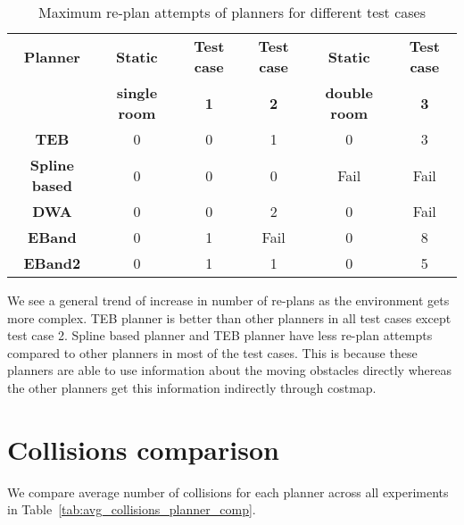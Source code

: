 \begin{table}[H]
    \centering
    \begin{tabular}{cccccc}\toprule
        \textbf{Planner} & \textbf{Static} & \textbf{Test case} & \textbf{Test case} & \textbf{Static} & \textbf{Test case} \\
                         & \textbf{single room} & \textbf{1} & \textbf{2} & \textbf{double room}       & \textbf{3} \\\toprule
        \textbf{TEB         } & 0 & 0 & 1 & 0 & 3 \\
        \textbf{Spline based} & 0 & 0 & 0 & Fail & Fail \\
        \textbf{DWA         } & 0 & 0 & 2 & 0 & Fail \\
        \textbf{EBand       } & 0 & 1 & Fail & 0 & 8 \\
        \textbf{EBand2      } & 0 & 1 & 1 & 0 & 5 \\
        \bottomrule
    \end{tabular}
    \caption{Maximum re-plan attempts of planners for different test cases}\label{tab:max_re-plan_planner_comp}
\end{table}

We see a general trend of increase in number of re-plans as the environment gets more complex. TEB
planner is better than other planners in all test cases except test case 2. Spline based planner and
TEB planner have less re-plan attempts compared to other planners in most of the test cases. This is 
because these planners are able to use information about the moving obstacles directly whereas the 
other planners get this information indirectly through costmap. 

\section{Collisions comparison}%
\label{sec:collisions_comparison}

We compare average number of collisions for each planner across all experiments in Table~\ref{tab:avg_collisions_planner_comp}.

